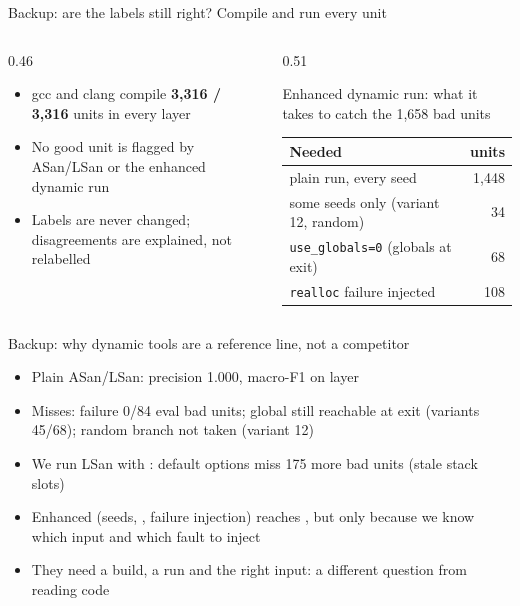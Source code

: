 \begin{frame}{Backup: are the labels still right? Compile and run every unit}
  \begin{columns}[T]
    \begin{column}{0.46\textwidth}
      \begin{itemize}\small
        \item gcc and clang compile \textbf{3,316 / 3,316} units in every layer
        \item No good unit is flagged by ASan/LSan or the enhanced dynamic run
        \item Labels are never changed; disagreements are explained, not relabelled
      \end{itemize}
    \end{column}
    \begin{column}{0.51\textwidth}
      {\footnotesize Enhanced dynamic run: what it takes to catch the 1,658 bad units\\[2pt]
      \begin{tabular}{@{}lr@{}}
        \toprule
        Needed & units \\
        \midrule
        plain run, every seed & 1,448 \\
        some seeds only (variant 12, random) & 34 \\
        \texttt{use\_globals=0} (globals at exit) & 68 \\
        \texttt{realloc} failure injected & 108 \\
        \bottomrule
      \end{tabular}}
    \end{column}
  \end{columns}
\end{frame}

\begin{frame}{Backup: why dynamic tools are a reference line, not a competitor}
  \begin{itemize}
    \item Plain ASan/LSan: precision 1.000, macro-F1  on layer 
    \item Misses:  failure 0/84 eval bad units; global still reachable at exit (variants 45/68);
          random branch not taken (variant 12)
    \item We run LSan with : default options miss 175 more bad units (stale  stack slots)
    \item Enhanced (seeds, , failure injection) reaches , but
          only because we know which input and which fault to inject
    \item They need a build, a run and the right input: a different question from reading code
  \end{itemize}
\end{frame}

